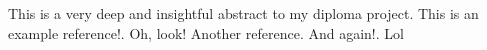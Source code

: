 \documentclass[../main.tex]{subfiles}
\begin{document}
This is a very deep and insightful abstract to my diploma project. This is an example
reference!\autocite{sph}. Oh, look!\autocite{sph} Another reference\autocite{this_paper}. And
again!\autocite{sph}. Lol\autocite{this_paper}
\end{document}
